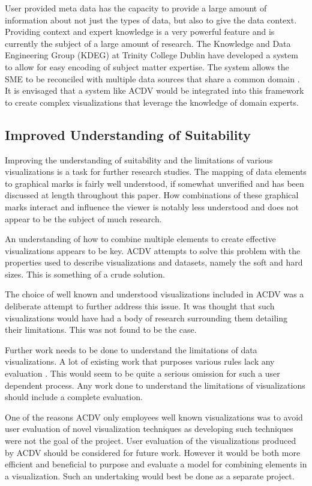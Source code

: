 \documentclass[a4paper, 11pt, titlepage, onehalfspacing]{report}
\begin{document}
User provided meta data has the capacity to provide a large amount of information about not just the types of data, but also to give the data context. Providing context and expert knowledge is a very powerful feature and is currently the subject of a large amount of research. The Knowledge and Data Engineering Group (KDEG) at Trinity College Dublin have developed a system to allow for easy encoding of subject matter expertise. The system allows the SME to be reconciled with multiple data sources that share a common domain \cite{champ}. It is envisaged that a system like AC\lightning{}DV would be integrated into this framework to create complex visualizations that leverage the knowledge of domain experts.

\subsection{Improved Understanding of Suitability}
Improving the understanding of suitability and the limitations of various visualizations is a task for further research studies. The mapping of data elements to graphical marks is fairly well understood, if somewhat unverified and has been discussed at length throughout this paper. How combinations of these graphical marks interact and influence the viewer is notably less understood and does not appear to be the subject of much research.

An understanding of how to combine multiple elements to create effective visualizations appears to be key. AC\lightning{}DV attempts to solve this problem with the properties used to describe visualizations and datasets, namely the soft and hard sizes. This is something of a crude solution.

The choice of well known and understood visualizations included in AC\lightning{}DV was a deliberate attempt to further address this issue. It was thought that such visualizations would have had a body of research surrounding them detailing their limitations. This was not found to be the case.

Further work needs to be done to understand the limitations of data visualizations. A lot of existing work that purposes various rules lack any evaluation \cite{card1999readings} \cite{mazza2009introduction}. This would seem to be quite a serious omission for such a user dependent process. Any work done to understand the limitations of visualizations should include a complete evaluation.

One of the reasons AC\lightning{}DV only employees well known visualizations was to avoid user evaluation of novel visualization techniques as developing such techniques were not the goal of the project. User evaluation of the visualizations produced by AC\lightning{}DV should be considered for future work. However it would be both more efficient and beneficial to purpose and evaluate a model for combining elements in a visualization. Such an undertaking would best be done as a separate project.
\end{document}
